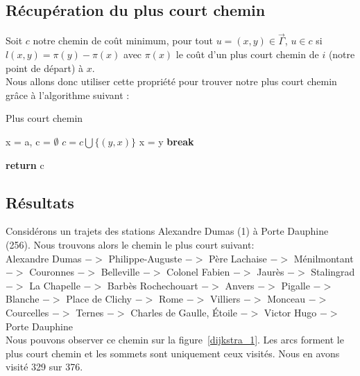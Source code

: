 \documentclass{article}
\begin{document}
\subsection{Récupération du plus court chemin}


Soit $c$ notre chemin de coût minimum, pour tout $u = (x,y) \in \vec{\Gamma}$, $ u \in c$ si 
$l(x,y) = \pi (y) - \pi (x)$ avec $\pi(x)$ le coût d'un plus court chemin de $i$ (notre point de départ)
à $x$.\\

Nous allons donc utiliser cette propriété pour trouver notre plus court chemin grâce à
l'algorithme suivant :\\

\clearpage


\begin{algorithm}
\caption{Plus court chemin}\label{pcc}
\begin{algorithmic}[1]
	\State x = a, c = $\emptyset$
				\State $c = c \bigcup \{(y,x)\}$
				\State x = y
				\State \textbf{break}
			\EndIf
		\EndFor
	\EndWhile
	
	\State \textbf{return} c
\EndProcedure
\end{algorithmic}
\end{algorithm}

\subsection{Résultats}

Considérons un trajets des stations Alexandre Dumas (1) à Porte Dauphine (256).
Nous trouvons alors le chemin le plus court suivant:\\

Alexandre Dumas
$->$ Philippe-Auguste
$->$ Père Lachaise
$->$ Ménilmontant
$->$ Couronnes
$->$ Belleville
$->$ Colonel Fabien
$->$ Jaurès
$->$ Stalingrad
$->$ La Chapelle
$->$ Barbès Rochechouart
$->$ Anvers
$->$ Pigalle
$->$ Blanche
$->$ Place de Clichy
$->$ Rome
$->$ Villiers
$->$ Monceau
$->$ Courcelles
$->$ Ternes
$->$ Charles de Gaulle, Étoile
$->$ Victor Hugo
$->$ Porte Dauphine\\

Nous pouvons observer ce chemin sur la figure~\ref{dijkstra_1}. Les arcs forment le plus court
chemin et les sommets sont uniquement ceux visités. Nous en avons visité 329 sur 376.\\
\end{document}
